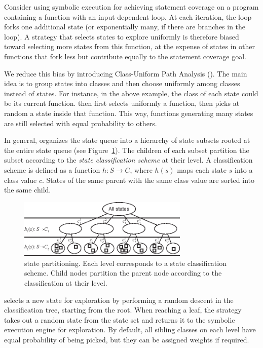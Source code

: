 Consider using symbolic execution for achieving statement coverage on a program containing a function with an input-dependent loop.  At each iteration, the loop forks one additional state (or exponentially many, if there are branches in the loop). A strategy that selects states to explore uniformly is therefore biased toward selecting more states from this function, at the expense of states in other functions that fork less but contribute equally to the statement coverage goal.

We reduce this bias by introducing Class-Uniform Path Analysis (\cupa).
%
The main idea is to group states into classes and then choose uniformly among classes instead of states.  For instance, in the above example, the class of each state could be its current function.  \cupa then first selects uniformly a function, then picks at random a state inside that function.  This way, functions generating many states are still selected with equal probability to others.

In general, \cupa organizes the state queue into a hierarchy of state subsets rooted at the entire state queue (see Figure~\ref{fig:cupa}).  The children of each subset partition the subset according to the \emph{state classification scheme} at their level.  A classification scheme is defined as a function $h: S \rightarrow C$, where $h(s)$ maps each state $s$ into a class value $c$.  States of the same parent with the same class value are sorted into the same child.
%
\begin{figure}
  \centering
  \includegraphics[width=3.2in]{figures/cupa/cupa}
  \caption{\cupa state partitioning.  Each level corresponds to a state classification scheme.  Child nodes partition the parent node according to the classification at their level.}
  \label{fig:cupa}
\end{figure}
%
\cupa selects a new state for exploration by performing a random descent in the classification tree, starting from the root.  When reaching a leaf, the strategy takes out a random state from the state set and returns it to the symbolic execution engine for exploration.  By default, all sibling classes on each level have equal probability of being picked, but they can be assigned weights if required.

